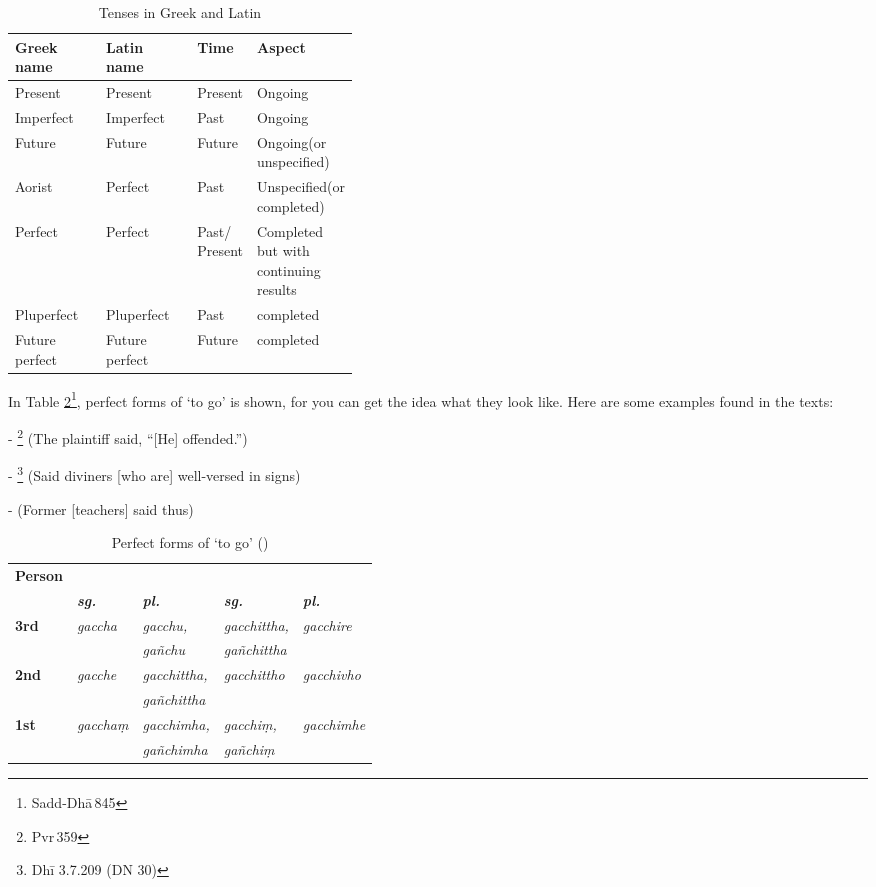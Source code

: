 \begin{table}[!hbt]
\centering\small
\caption{Tenses in Greek and Latin}
\label{tab:gltenses}
\bigskip
\begin{tabular}{@{}llp{0.12\linewidth}>{\raggedright\arraybackslash}p{0.28\linewidth}@{}} \toprule
\bfseries Greek name & \bfseries Latin name & \bfseries Time & \bfseries Aspect \\
\midrule
Present & Present & Present & Ongoing \\
Imperfect & Imperfect & Past & Ongoing \\
Future & Future & Future & Ongoing\linebreak (or unspecified) \\
Aorist & Perfect & Past & Unspecified\linebreak (or completed) \\
Perfect & Perfect & Past/ Present & Completed but with continuing results \\
Pluperfect & Pluperfect & Past & completed \\
Future perfect & Future perfect & Future & completed \\
\bottomrule
\end{tabular}
\end{table}

In Table \ref{tab:exparo}\footnote{Sadd-Dh\=a\,845}, perfect forms of `to go' is shown, for you can get the idea what they look like. Here are some examples found in the texts:

- \footnote{Pvr\,359} (The plaintiff said, ``[He] offended.'')\par
- \footnote{Dh\=i 3.7.209 (DN 30)} (Said diviners [who are] well-versed in signs)\par
-  (Former [teachers] said thus)\par

\begin{table}[!hbt]
\centering
\caption{Perfect forms of `to go' ()}
\label{tab:exparo}
\bigskip
\begin{tabular}{@{}>{\bfseries}l*{4}{>{\itshape}l}@{}} \toprule
Person & \multicolumn{2}{c}{\bfseries\itshape Parassapada} & \multicolumn{2}{c}{\bfseries\itshape Attanopada} \\
\cmidrule(l){2-3}\cmidrule(l){4-5}
& \bfseries\upshape sg. & \bfseries\upshape pl. &  \bfseries\upshape sg. &  \bfseries\upshape pl. \\
\midrule
3rd & gaccha & gacchu, & gacchittha, & gacchire \\
& & ga\~nchu & ga\~nchittha & \\
2nd & gacche & gacchittha, & gacchittho & gacchivho \\
& & ga\~nchittha & & \\
1st & gaccha\d m & gacchimha, & gacchi\d m, & gacchimhe \\
& & ga\~nchimha & ga\~nchi\d m & \\
\bottomrule
\end{tabular}
\end{table}

